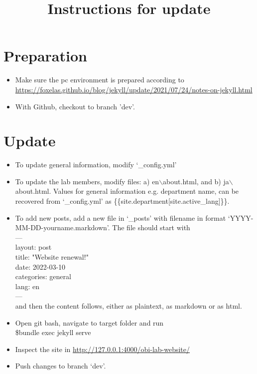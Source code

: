 \documentclass[12pt, letterpaper]{article}
\title{Instructions for update}
\begin{document}
\maketitle

\section{Preparation}
\begin{itemize}
\item Make sure the pc environment is prepared according to \url{https://foxelas.github.io/blog/jekyll/update/2021/07/24/notes-on-jekyll.html}
\item With Github, checkout to branch 'dev'.
\end{itemize}

\section{Update}
\begin{itemize}
\item To update general information, modify `\_config.yml'
\item To update the lab members, modify files: a) en$\backslash$about.html, and b) ja$\backslash$ about.html. Values for general information e.g. department name, can be recovered from `\_config.yml' as \{\{site.department[site.active\_lang]\}\}. 
\item To add new posts, add a new file in `\_posts' with filename in format `YYYY-MM-DD-yourname.markdown'. The file should start with \\

---\\
layout: post\\
title: "Website renewal!"\\
date: 2022-03-10\\
categories: general\\
lang: en\\
---\\

and then the content follows, either as plaintext, as markdown or as html. 

\item Open git bash, navigate to target folder and run \\
\$bundle exec jekyll serve
\item Inspect the site in \url{http://127.0.0.1:4000/obi-lab-website/}
\item Push changes to branch `dev'.
\end{itemize}
\end{document}
